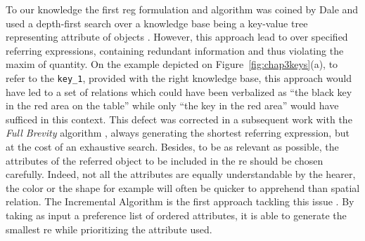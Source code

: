 \documentclass[a4paper,11pt,twoside]{StyleThese}
\begin{document}
To our knowledge the first \acrshort{reg} formulation and algorithm was coined by Dale and used a depth-first search over a knowledge base being a key-value tree representing attribute of objects \cite{dale1989cooking}. However, this approach lead to over specified referring expressions, containing redundant information and thus violating the maxim of quantity. On the example depicted on Figure~\ref{fig:chap3keys}(a), to refer to the \verb'key_1', provided with the right knowledge base, this approach would have led to a set of relations which could have been verbalized as ``the black key in the red area on the table'' while only ``the key in the red area'' would have sufficed in this context. This defect was corrected in a subsequent work with the \textit{Full Brevity} algorithm \cite{dale1992generating}, always generating the shortest referring expression, but at the cost of an exhaustive search. Besides, to be as relevant as possible, the attributes of the referred object to be included in the \acrshort{re} should be chosen carefully. Indeed, not all the attributes are equally understandable by the hearer, the color or the shape for example will often be quicker to apprehend than spatial relation. The Incremental Algorithm is the first approach tackling this issue \cite{dale1995computational}. By taking as input a preference list of ordered attributes, it is able to generate the smallest \acrshort{re} while prioritizing the attribute used.
\end{document}
